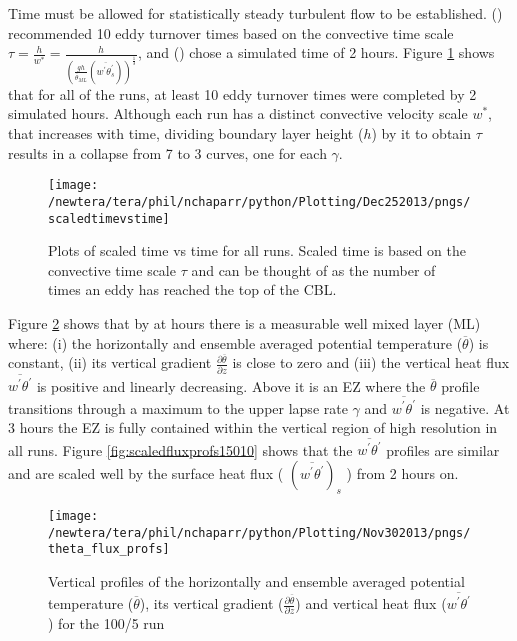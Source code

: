 Time must be allowed for statistically steady turbulent flow to be established.  \citeauthor{SullMoengStev} 
(\citeyear{SullMoengStev}) recommended 10 eddy turnover times based on the convective time scale 
$\tau = \frac{h}{w^{*}} = \frac{h}{ \left( \frac{gh}{\overline{\theta}_{ML}}(\overline{w^{'} \theta^{'}_{s}}) \right)^{\frac{1}{3}} } $, 
and \citeauthor{BrooksFowler2} (\citeyear{BrooksFowler2}) chose a simulated time of 2 hours.  Figure \ref{fig:ScaledTimevsTime} shows that for all of 
the runs, at least 10 eddy turnover times were completed by 2 simulated hours.  
Although each run has a distinct convective velocity scale $w^{*}$, that increases with time, 
dividing boundary layer height ($h$) by it to obtain $\tau$ results in a collapse from 7 to 3 curves, 
one for each $\gamma$.\\

\begin{figure}[!h]
    \centering
    \texttt{[image: /newtera/tera/phil/nchaparr/python/Plotting/Dec252013/pngs/scaledtimevstime]}
    \caption[Scaled time vs Time]{Plots of scaled time vs time for all runs.  Scaled time is based on the convective time scale $\tau$ 
    and can be thought of as the number of times an eddy has reached the top of the CBL.}
    \label{fig:ScaledTimevsTime}   
\end{figure}

Figure \ref{fig:tempgradfluxprofs1005} shows that by at hours there is a measurable well mixed layer (\acs{ML}) where: (i) the horizontally and ensemble averaged potential temperature ($\overline{\theta}$) is constant, (ii) its vertical gradient $\frac{\partial \overline{\theta}}{\partial z}$ is close to zero and (iii) the vertical heat flux $\overline{w^{'}\theta^{'}}$ is positive and linearly decreasing. Above it is an \acs{EZ} where the $\overline{\theta}$ profile transitions through a maximum to the upper lapse rate $\gamma$ and $\overline{w^{'}\theta^{'}}$ is negative.  At 3 hours the \acs{EZ} is fully contained within the vertical region of high resolution in all runs.  Figure \ref{fig:scaledfluxprofs15010} shows that the $\overline{w^{'}\theta^{'}}$ profiles are similar and are scaled well by the surface heat flux ( $(\overline{w^{'}\theta^{'}})_{s}$ ) from 2 hours on.\\

\begin{figure}[htbp]
    \centering
    \texttt{[image: /newtera/tera/phil/nchaparr/python/Plotting/Nov302013/pngs/theta\_flux\_profs]}
    \caption[Profiles of $\overline{\theta}$, $\frac{\partial \overline{\theta}}{\partial z}$ and $\overline{w^{'}\theta^{'}}$]{Vertical profiles of the horizontally and ensemble averaged potential temperature ($\overline{\theta}$), its vertical gradient ($\frac{\partial \overline{\theta}}{\partial z}$)  
     and vertical heat flux ($\overline{w^{'}\theta^{'}}$) for the 100/5 run}
    \label{fig:tempgradfluxprofs1005}   %
\end{figure}


